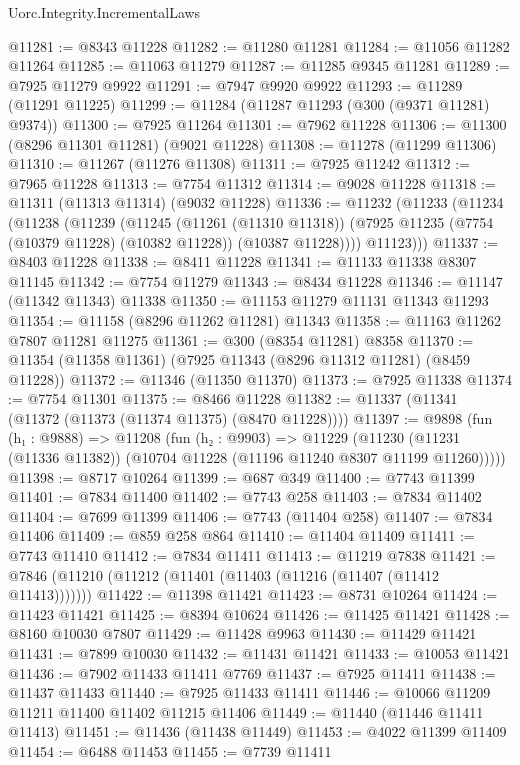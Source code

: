 \begin{lexlean}{Uorc.Integrity.IncrementalLaws}
\begin{coremodule}
@11281 := @8343 @11228
@11282 := @11280 @11281
@11284 := @11056 @11282 @11264
@11285 := @11063 @11279
@11287 := @11285 @9345 @11281
@11289 := @7925 @11279 @9922
@11291 := @7947 @9920 @9922
@11293 := @11289 (@11291 @11225)
@11299 := @11284 (@11287 @11293 (@300 (@9371 @11281) @9374))
@11300 := @7925 @11264
@11301 := @7962 @11228
@11306 := @11300 (@8296 @11301 @11281) (@9021 @11228)
@11308 := @11278 (@11299 @11306)
@11310 := @11267 (@11276 @11308)
@11311 := @7925 @11242
@11312 := @7965 @11228
@11313 := @7754 @11312
@11314 := @9028 @11228
@11318 := @11311 (@11313 @11314) (@9032 @11228)
@11336 := @11232
    (@11233
      (@11234
        (@11238
          (@11239
            (@11245
              (@11261 (@11310 @11318))
              (@7925 @11235 (@7754 (@10379 @11228) (@10382 @11228)) (@10387 @11228))))
          @11123)))
@11337 := @8403 @11228
@11338 := @8411 @11228
@11341 := @11133 @11338 @8307 @11145
@11342 := @7754 @11279
@11343 := @8434 @11228
@11346 := @11147 (@11342 @11343) @11338
@11350 := @11153 @11279 @11131 @11343 @11293
@11354 := @11158 (@8296 @11262 @11281) @11343
@11358 := @11163 @11262 @7807 @11281 @11275
@11361 := @300 (@8354 @11281) @8358
@11370 := @11354 (@11358 @11361) (@7925 @11343 (@8296 @11312 @11281) (@8459 @11228))
@11372 := @11346 (@11350 @11370)
@11373 := @7925 @11338
@11374 := @7754 @11301
@11375 := @8466 @11228
@11382 := @11337 (@11341 (@11372 (@11373 (@11374 @11375) (@8470 @11228))))
@11397 := @9898
    (fun (h₁ : @9888) =>
    @11208
      (fun (h₂ : @9903) =>
      @11229 (@11230 (@11231 (@11336 @11382)) (@10704 @11228 (@11196 @11240 @8307 @11199 @11260)))))
@11398 := @8717 @10264
@11399 := @687 @349
@11400 := @7743 @11399
@11401 := @7834 @11400
@11402 := @7743 @258
@11403 := @7834 @11402
@11404 := @7699 @11399
@11406 := @7743 (@11404 @258)
@11407 := @7834 @11406
@11409 := @859 @258 @864
@11410 := @11404 @11409
@11411 := @7743 @11410
@11412 := @7834 @11411
@11413 := @11219 @7838
@11421 := @7846 (@11210 (@11212 (@11401 (@11403 (@11216 (@11407 (@11412 @11413)))))))
@11422 := @11398 @11421
@11423 := @8731 @10264
@11424 := @11423 @11421
@11425 := @8394 @10624
@11426 := @11425 @11421
@11428 := @8160 @10030 @7807
@11429 := @11428 @9963
@11430 := @11429 @11421
@11431 := @7899 @10030
@11432 := @11431 @11421
@11433 := @10053 @11421
@11436 := @7902 @11433 @11411 @7769
@11437 := @7925 @11411
@11438 := @11437 @11433
@11440 := @7925 @11433 @11411
@11446 := @10066 @11209 @11211 @11400 @11402 @11215 @11406
@11449 := @11440 (@11446 @11411 @11413)
@11451 := @11436 (@11438 @11449)
@11453 := @4022 @11399 @11409
@11454 := @6488 @11453
@11455 := @7739 @11411

\end{coremodule}
\end{lexlean}
